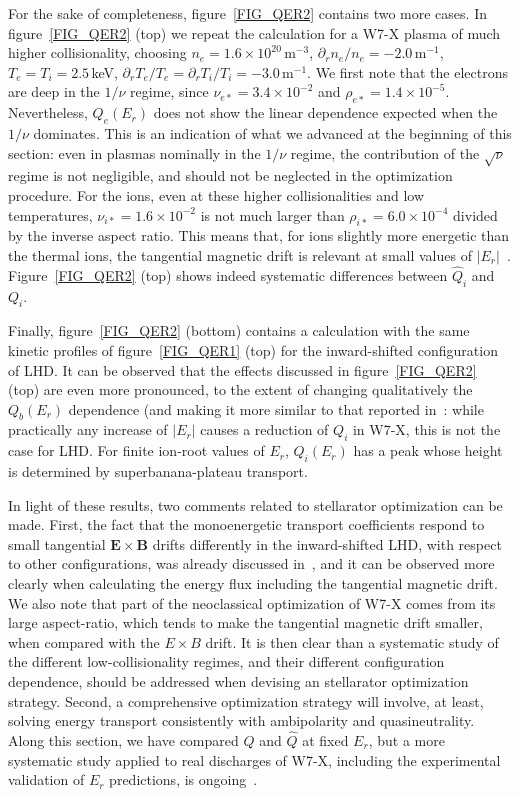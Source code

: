 For the sake of completeness, figure~\ref{FIG_QER2} contains two more cases. In figure~\ref{FIG_QER2} (top) we repeat the calculation for a W7-X plasma of much higher collisionality, choosing $n_e=1.6\times 10^{20}\,$m$^{-3}$, $\partial_r n_e/n_e=-2.0\,$m$^{-1}$, $T_e = T_i = 2.5\,$keV, $\partial_r T_e/T_e =\partial_r T_i/T_i = -3.0\,$m$^{-1}$. We first note that the electrons are deep in the $1/\nu$ regime, since $\nu_{e*}=3.4\times 10^{-2}$ and $\rho_{e*}=1.4\times 10^{-5}$. Nevertheless, $Q_e(E_r)$ does not show the linear dependence expected when the $1/\nu$ dominates. This is an indication of what we advanced at the beginning of this section: even in plasmas nominally in the $1/\nu$ regime, the contribution of the $\sqrt{\nu}$ regime is not negligible, and should not be neglected in the optimization procedure. For the ions, even at these higher collisionalities and low temperatures, $\nu_{i*} = 1.6\times 10^{-2}$ is not much larger than $\rho_{i*} = 6.0\times 10^{-4}$ divided by the inverse aspect ratio. This means that, for ions slightly more energetic than the thermal ions, the tangential magnetic drift is relevant at small values of $|E_r|$~\citep{calvo2018jpp}. Figure~\ref{FIG_QER2} (top) shows indeed systematic differences between $\hat Q_i$ and $Q_i$. 

Finally, figure~\ref{FIG_QER2} (bottom) contains a calculation with the same kinetic profiles of figure~\ref{FIG_QER1} (top) for the inward-shifted configuration of LHD. It can be observed that the effects discussed in figure~\ref{FIG_QER2} (top) are even more pronounced, to the extent of changing qualitatively the $Q_b(E_r)$ dependence (and making it more similar to that reported in~\citep{matsuoka2015tangential}: while practically any increase of $|E_r|$ causes a reduction of $Q_i$ in W7-X, this is not the case for LHD. For finite ion-root values of $E_r$, $Q_i(E_r)$ has a peak whose height is determined by superbanana-plateau transport. 

In light of these results, two comments related to stellarator optimization can be made. First, the fact that the monoenergetic transport coefficients respond to small tangential $\mathbf{E}\times\mathbf{B}$ drifts differently in the inward-shifted LHD, with respect to other configurations, was already discussed in~\citep{beidler2011icnts}, and it can be observed more clearly when calculating the energy flux including the tangential magnetic drift. We also note that part of the neoclassical optimization of W7-X comes from its large aspect-ratio, which tends to make the tangential magnetic drift smaller, when compared with the $E\times B$ drift. It is then clear than a systematic study of the different low-collisionality regimes, and their different configuration dependence, should be addressed when devising an stellarator optimization strategy. Second, a comprehensive optimization strategy will involve, at least, solving energy transport consistently with ambipolarity and quasineutrality. Along this section, we have compared $Q$ and $\hat Q$ at fixed $E_r$, but a more systematic study applied to real discharges of W7-X, including the experimental validation of $E_r$ predictions, is ongoing~\citep{carralero2019irw}.

